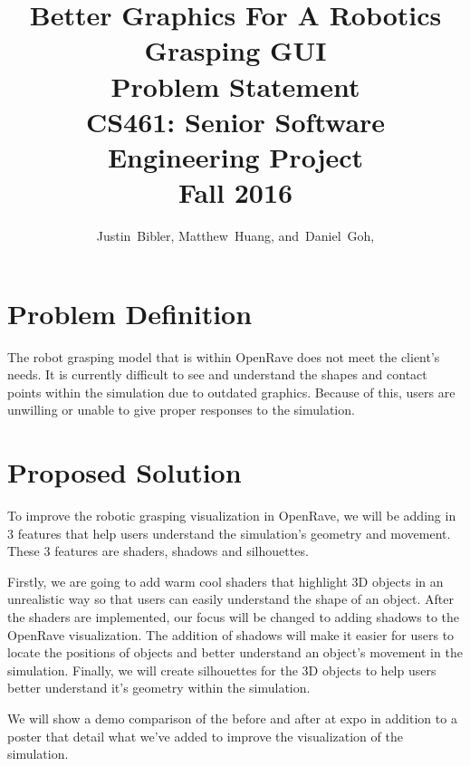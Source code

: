 \documentclass[10pt,journal,compsoc]{IEEEtran}
\begin{document}
\onecolumn
\begin{titlepage}
\title{Better Graphics For A Robotics Grasping GUI\\ Problem Statement \\  [0.5em] 
	\large CS461: Senior Software Engineering Project \\ Fall 2016}

\author{Justin~Bibler,
        Matthew~Huang,
        and~Daniel~Goh,}
		

\maketitle

\end{titlepage}

\section{Problem Definition}
The robot grasping model that is within OpenRave does not meet the client’s needs. 
It is currently difficult to see and understand the shapes and contact points within the simulation due to outdated graphics. 
Because of this, users are unwilling or unable to give proper responses to the simulation.

\section{Proposed Solution}
To improve the robotic grasping visualization in OpenRave, 
we will be adding in 3 features that help users understand the simulation’s 
geometry and movement. These 3 features are shaders, shadows and silhouettes. \par
Firstly, we are going to add warm cool shaders that highlight 3D objects in an 
unrealistic way so that users can easily understand the shape of an object. 
After the shaders are implemented, our focus will be changed to adding shadows 
to the OpenRave visualization. The addition of shadows will make it easier for 
users to locate the positions of objects and better understand an object’s movement 
in the simulation. Finally, we will create silhouettes for the 3D objects to help 
users better understand it’s geometry within the simulation. \par
We will show a demo comparison of the before and after at expo in addition to a 
poster that detail what we’ve added to improve the visualization of the simulation.
\end{document}
